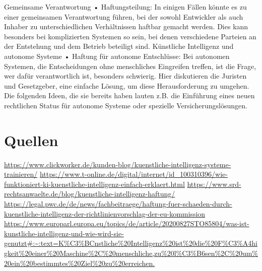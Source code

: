 \documentclass{report}
\begin{document}
Gemeinsame Verantwortung
•	Haftungsteilung: In einigen Fällen könnte es zu einer gemeinsamen Verantwortung führen, bei der sowohl Entwickler als auch Inhaber zu unterschiedlichen Verhältnissen haftbar gemacht werden. Dies kann besonders bei komplizierten Systemen so sein, bei denen verschiedene Parteien an der Entstehung und dem Betrieb beteiligt sind.
Künstliche Intelligenz und autonome Systeme
•	Haftung für autonome Entschlüsse: Bei autonomen Systemen, die Entscheidungen ohne menschliches Eingreifen treffen, ist die Frage, wer dafür verantwortlich ist, besonders schwierig. Hier diskutieren die Juristen und Gesetzgeber, eine einfache Lösung, um diese Herausforderung zu umgehen. Die folgenden Ideen, die sie bereits haben lauten z.B. die Einführung eines neuen rechtlichen Status für autonome Systeme oder spezielle Versicherungslösungen.

\chapter{Quellen}

\url {https://www.clickworker.de/kunden-blog/kuenstliche-intelligenz-systeme-trainieren/}
 \url{https://www.t-online.de/digital/internet/id_100310396/wie-funktioniert-ki-kuenstliche-intelligenz-einfach-erklaert.html}
 \url {https://www.srd-rechtsanwaelte.de/blog/kuenstliche-intelligenz-haftung/}
 \url {https://legal.pwc.de/de/news/fachbeitraege/haftung-fuer-schaeden-durch-kuenstliche-intelligenz-der-richtlinienvorschlag-der-eu-kommission}
\url {https://www.europarl.europa.eu/topics/de/article/20200827STO85804/was-ist-kunstliche-intelligenz-und-wie-wird-sie-genutzt#:~:text=K%C3%BCnstliche%20Intelligenz%20ist%20die%20F%C3%A4higkeit%20einer%20Maschine%2C%20menschliche,zu%20l%C3%B6sen%2C%20um%20ein%20bestimmtes%20Ziel%20zu%20erreichen.}

 



\printbibliography
\end{document}
